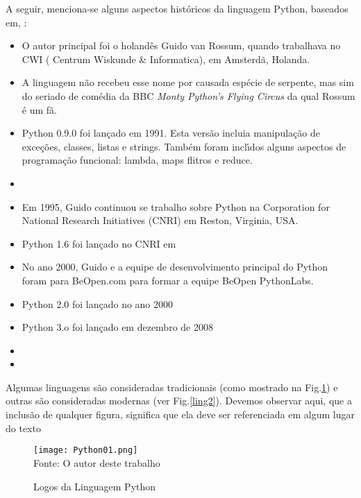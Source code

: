 A seguir, menciona-se alguns aspectos hist\'{o}ricos da linguagem Python, baseados em\cite{Perkovic2016}, \cite{Severance2015} :
\begin{itemize}
  \item O autor principal foi o holand\^{e}s Guido van Rossum, quando trabalhava no CWI ( Centrum Wiskunde \& Informatica), em Amsterd\~{a}, Holanda.
  \item  A linguagem n\~{a}o recebeu esse nome por causada esp\'{e}cie de serpente, mas sim do seriado de com\'{e}dia da BBC \textit{Monty Python's Flying Circus} da qual Rossum \'{e} um f\~{a}.
  \item Python 0.9.0 foi lan\c{c}ado em 1991.  Esta vers\~{a}o incluia manipula\c{c}\~{a}o de exce\c{c}\~{o}es, classes, listas e strings. Tamb\'{e}m foram incl\'{\i}dos alguns aspectos de programa\c{c}\~{a}o funcional: lambda, maps flitros e reduce.

  \item
  \item  Em 1995, Guido continuou se trabalho sobre Python na Corporation for National Research Initiatives (CNRI) em Reston, Virginia, USA.
  \item Python 1.6 foi lan\c{c}ado no CNRI em
  \item  No ano 2000, Guido e a equipe de desenvolvimento principal do Python foram para BeOpen.com para formar a equipe BeOpen PythonLabs.
  \item Python 2.0 foi lan\c{c}ado no ano 2000
  \item Python 3.o foi lan\c{c}ado em dezembro de 2008  \item
  \item
\end{itemize}

Algumas linguagens s\~{a}o consideradas  tradicionais (como mostrado na Fig.\ref{ling1}) e outras s\~{a}o consideradas modernas (ver Fig.\ref{ling2}). Devemos observar aqui, que a inclus\~{a}o de qualquer figura, significa que ela deve ser referenciada em algum lugar do texto
   \begin{figure}[H]
    \begin{center}
        \caption{Logos da Linguagem Python} \label{ling1}
        \texttt{[image: Python01.png]} \\
        {\tiny \sf Fonte: O autor deste trabalho }
    \end{center}
   \end{figure}

